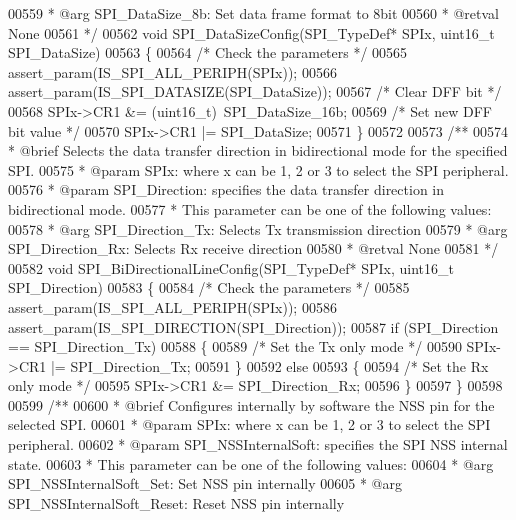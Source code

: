 \begin{DoxyCode}
00559 \textcolor{comment}{  *            @arg SPI\_DataSize\_8b: Set data frame format to 8bit}
00560 \textcolor{comment}{  * @retval None}
00561 \textcolor{comment}{  */}
00562 \textcolor{keywordtype}{void} SPI_DataSizeConfig(SPI\_TypeDef* SPIx, uint16\_t SPI\_DataSize)
00563 \{
00564   \textcolor{comment}{/* Check the parameters */}
00565   assert_param(IS\_SPI\_ALL\_PERIPH(SPIx));
00566   assert_param(IS\_SPI\_DATASIZE(SPI\_DataSize));
00567   \textcolor{comment}{/* Clear DFF bit */}
00568   SPIx->CR1 &= (uint16\_t)~SPI_DataSize_16b;
00569   \textcolor{comment}{/* Set new DFF bit value */}
00570   SPIx->CR1 |= SPI\_DataSize;
00571 \}
00572 
00573 \textcolor{comment}{/**}
00574 \textcolor{comment}{  * @brief  Selects the data transfer direction in bidirectional mode for the specified SPI.}
00575 \textcolor{comment}{  * @param  SPIx: where x can be 1, 2 or 3 to select the SPI peripheral.}
00576 \textcolor{comment}{  * @param  SPI\_Direction: specifies the data transfer direction in bidirectional mode. }
00577 \textcolor{comment}{  *          This parameter can be one of the following values:}
00578 \textcolor{comment}{  *            @arg SPI\_Direction\_Tx: Selects Tx transmission direction}
00579 \textcolor{comment}{  *            @arg SPI\_Direction\_Rx: Selects Rx receive direction}
00580 \textcolor{comment}{  * @retval None}
00581 \textcolor{comment}{  */}
00582 \textcolor{keywordtype}{void} SPI_BiDirectionalLineConfig(SPI\_TypeDef* SPIx, uint16\_t SPI\_Direction)
00583 \{
00584   \textcolor{comment}{/* Check the parameters */}
00585   assert_param(IS\_SPI\_ALL\_PERIPH(SPIx));
00586   assert_param(IS\_SPI\_DIRECTION(SPI\_Direction));
00587   \textcolor{keywordflow}{if} (SPI\_Direction == SPI_Direction_Tx)
00588   \{
00589     \textcolor{comment}{/* Set the Tx only mode */}
00590     SPIx->CR1 |= SPI_Direction_Tx;
00591   \}
00592   \textcolor{keywordflow}{else}
00593   \{
00594     \textcolor{comment}{/* Set the Rx only mode */}
00595     SPIx->CR1 &= SPI_Direction_Rx;
00596   \}
00597 \}
00598 
00599 \textcolor{comment}{/**}
00600 \textcolor{comment}{  * @brief  Configures internally by software the NSS pin for the selected SPI.}
00601 \textcolor{comment}{  * @param  SPIx: where x can be 1, 2 or 3 to select the SPI peripheral.}
00602 \textcolor{comment}{  * @param  SPI\_NSSInternalSoft: specifies the SPI NSS internal state.}
00603 \textcolor{comment}{  *          This parameter can be one of the following values:}
00604 \textcolor{comment}{  *            @arg SPI\_NSSInternalSoft\_Set: Set NSS pin internally}
00605 \textcolor{comment}{  *            @arg SPI\_NSSInternalSoft\_Reset: Reset NSS pin internally}

\end{DoxyCode}
